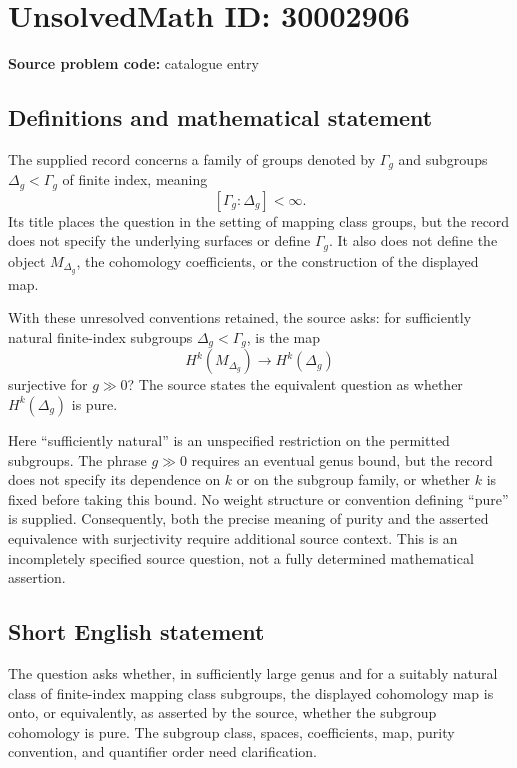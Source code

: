 \documentclass[11pt]{article}
\begin{document}
\section*{UnsolvedMath ID: 30002906}
\textbf{Source problem code:} catalogue entry
\subsection{Definitions and mathematical statement}
The supplied record concerns a family of groups denoted by $\Gamma_g$ and subgroups $\Delta_g<\Gamma_g$ of finite index, meaning
\[
[\Gamma_g:\Delta_g]<\infty.
\]
Its title places the question in the setting of mapping class groups, but the record does not specify the underlying surfaces or define $\Gamma_g$. It also does not define the object $M_{\Delta_g}$, the cohomology coefficients, or the construction of the displayed map.

With these unresolved conventions retained, the source asks: for sufficiently natural finite-index subgroups $\Delta_g<\Gamma_g$, is the map
\[
H^k(M_{\Delta_g})\longrightarrow H^k(\Delta_g)
\]
surjective for $g\gg 0$? The source states the equivalent question as whether $H^k(\Delta_g)$ is pure.

Here ``sufficiently natural'' is an unspecified restriction on the permitted subgroups. The phrase $g\gg 0$ requires an eventual genus bound, but the record does not specify its dependence on $k$ or on the subgroup family, or whether $k$ is fixed before taking this bound. No weight structure or convention defining ``pure'' is supplied. Consequently, both the precise meaning of purity and the asserted equivalence with surjectivity require additional source context. This is an incompletely specified source question, not a fully determined mathematical assertion.
\subsection{Short English statement}
The question asks whether, in sufficiently large genus and for a suitably natural class of finite-index mapping class subgroups, the displayed cohomology map is onto, or equivalently, as asserted by the source, whether the subgroup cohomology is pure. The subgroup class, spaces, coefficients, map, purity convention, and quantifier order need clarification.
\end{document}
